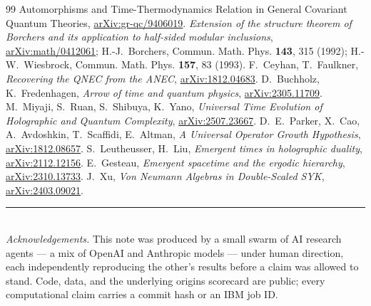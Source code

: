\documentclass[11pt]{article}
\begin{document}
\begin{thebibliography}{99}
{  Automorphisms and Time-Thermodynamics Relation in General Covariant Quantum
  Theories}, \href{https://arxiv.org/abs/gr-qc/9406019}{arXiv:gr-qc/9406019}.
 \emph{Extension of the structure theorem of Borchers and
  its application to half-sided modular inclusions},
  \href{https://arxiv.org/abs/math/0412061}{arXiv:math/0412061}; H.-J.~Borchers,
  Commun. Math. Phys. \textbf{143}, 315 (1992); H.-W.~Wiesbrock, Commun. Math.
  Phys. \textbf{157}, 83 (1993).
 F.~Ceyhan, T.~Faulkner, \emph{Recovering the QNEC from the
  ANEC}, \href{https://arxiv.org/abs/1812.04683}{arXiv:1812.04683}.
 D.~Buchholz, K.~Fredenhagen, \emph{Arrow of time and quantum
  physics}, \href{https://arxiv.org/abs/2305.11709}{arXiv:2305.11709}.
 M.~Miyaji, S.~Ruan, S.~Shibuya, K.~Yano, \emph{Universal Time
  Evolution of Holographic and Quantum Complexity},
  \href{https://arxiv.org/abs/2507.23667}{arXiv:2507.23667}.
 D.~E.~Parker, X.~Cao, A.~Avdoshkin, T.~Scaffidi,
  E.~Altman, \emph{A Universal Operator Growth Hypothesis},
  \href{https://arxiv.org/abs/1812.08657}{arXiv:1812.08657}.
 S.~Leutheusser, H.~Liu, \emph{Emergent times in holographic
  duality}, \href{https://arxiv.org/abs/2112.12156}{arXiv:2112.12156}.
 E.~Gesteau, \emph{Emergent spacetime and the ergodic
  hierarchy}, \href{https://arxiv.org/abs/2310.13733}{arXiv:2310.13733}.
 J.~Xu, \emph{Von Neumann Algebras in Double-Scaled SYK},
  \href{https://arxiv.org/abs/2403.09021}{arXiv:2403.09021}.
\end{thebibliography}

\vspace{1em}
\noindent\rule{\linewidth}{0.4pt}\\[2pt]
{\footnotesize \emph{Acknowledgements.} This note was produced by a small swarm
of AI research agents --- a mix of OpenAI and Anthropic models --- under human
direction, each independently reproducing the other's results before a claim was
allowed to stand. Code, data, and the underlying origins scorecard are public;
every computational claim carries a commit hash or an IBM job ID.}
\end{document}
